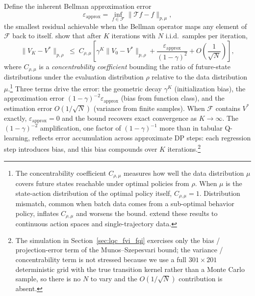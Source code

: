 Define the inherent Bellman approximation error
\begin{equation}
\varepsilon_{\mathrm{approx}} = \inf_{f \in \mathcal{F}} \| \mathcal{T} f - f \|_{p,\mu},
\end{equation}
the smallest residual achievable when the Bellman operator maps any element of $\mathcal{F}$ back to itself. \citet{MunosSzepesvari2008} show that after $K$ iterations with $N$ i.i.d.\ samples per iteration,
\begin{equation}
\| V_{K} - V^* \|_{p,\rho} \;\leq\; C_{\rho,\mu} \left[ \gamma^K \|V_0 - V^*\|_{p,\rho} + \frac{\varepsilon_{\mathrm{approx}}}{(1-\gamma)^2} + O\!\left(\frac{1}{\sqrt{N}}\right) \right],
\label{eq:fvi_error_bound}
\end{equation}
where $C_{\rho,\mu}$ is a \emph{concentrability coefficient} bounding the ratio of future-state distributions under the evaluation distribution $\rho$ relative to the data distribution $\mu$.\footnote{The concentrability coefficient $C_{\rho,\mu}$ measures how well the data distribution $\mu$ covers future states reachable under optimal policies from $\rho$. When $\mu$ is the state-action distribution of the optimal policy itself, $C_{\rho,\mu} = 1$. Distribution mismatch, common when batch data comes from a sub-optimal behavior policy, inflates $C_{\rho,\mu}$ and worsens the bound. \citet{Antos2008} extend these results to continuous action spaces and single-trajectory data.} Three terms drive the error: the geometric decay $\gamma^K$ (initialization bias), the approximation error $(1-\gamma)^{-2} \varepsilon_{\mathrm{approx}}$ (bias from function class), and the estimation error $O(1/\sqrt{N})$ (variance from finite samples). When $\mathcal{F}$ contains $V^*$ exactly, $\varepsilon_{\mathrm{approx}} = 0$ and the bound recovers exact convergence as $K \to \infty$. The $(1-\gamma)^{-2}$ amplification, one factor of $(1-\gamma)^{-1}$ more than in tabular Q-learning, reflects error accumulation across approximate DP steps: each regression step introduces bias, and this bias compounds over $K$ iterations.\footnote{The simulation in Section~\ref{sec:lqc_fvi_fqi} exercises only the bias / projection-error term of the Munos--Szepesvari bound; the variance / concentrability term is not stressed because we use a full $301 \times 201$ deterministic grid with the true transition kernel rather than a Monte Carlo sample, so there is no $N$ to vary and the $O(1/\sqrt{N})$ contribution is absent.}

